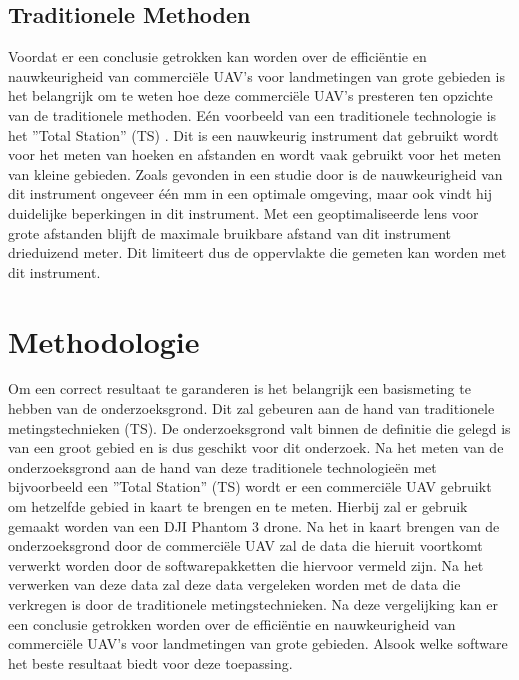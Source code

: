 \documentclass{hogent-article}
\begin{document}
\subsection{Traditionele Methoden}
\label{sec:Traditionele Methoden}
Voordat er een conclusie getrokken kan worden over de efficiëntie en nauwkeurigheid van commerciële UAV's voor landmetingen van grote gebieden is het belangrijk om te weten hoe deze commerciële UAV's presteren ten opzichte van de traditionele methoden. Eén voorbeeld van een traditionele technologie is het ''Total Station'' (TS) \autocite{chekole2014surveying}.
Dit is een nauwkeurig instrument dat gebruikt wordt voor het meten van hoeken en afstanden en wordt vaak gebruikt voor het meten van kleine gebieden. Zoals gevonden in een studie door \textcite{chekole2014surveying} is de nauwkeurigheid van dit instrument ongeveer één mm in een optimale omgeving, maar ook vindt hij duidelijke beperkingen in dit instrument. Met een geoptimaliseerde lens voor grote afstanden blijft de maximale bruikbare afstand van dit instrument drieduizend meter. Dit limiteert dus de oppervlakte die gemeten kan worden met dit instrument.


\section{Methodologie}
\label{sec:methodologie}

Om een correct resultaat te garanderen is het belangrijk een basismeting te hebben van de onderzoeksgrond. Dit zal gebeuren aan de hand van traditionele metingstechnieken (TS).
De onderzoeksgrond valt binnen de definitie die gelegd is van een groot gebied en is dus geschikt voor dit onderzoek.
Na het meten van de onderzoeksgrond aan de hand van deze traditionele technologieën met bijvoorbeeld een ''Total Station'' (TS) wordt er een commerciële UAV gebruikt om hetzelfde gebied in kaart te brengen en te meten. Hierbij zal er gebruik gemaakt worden van een DJI Phantom 3\textsuperscript{\textregistered} drone.
Na het in kaart brengen van de onderzoeksgrond door de commerciële UAV zal de data die hieruit voortkomt verwerkt worden door de softwarepakketten die hiervoor vermeld zijn. Na het verwerken van deze data zal deze data vergeleken worden met de data die verkregen is door de traditionele metingstechnieken.
Na deze vergelijking kan er een conclusie getrokken worden over de efficiëntie en nauwkeurigheid van commerciële UAV's voor landmetingen van grote gebieden. Alsook welke software het beste resultaat biedt voor deze toepassing.
\end{document}
